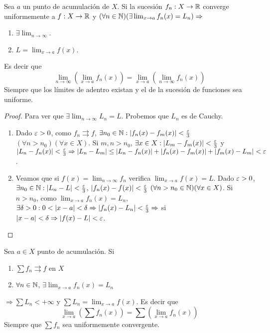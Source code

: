 \begin{theorem}
  Sea $a$ un punto de acumulación de $X$. Si la sucesión $f_n: X \to \mathbb{R}$ converge uniformemente a $f: X \to \mathbb{R}$ y $(\forall n \in \mathbb{N})(\exists \lim_{x \to a} f_n(x) = L_n) \Rightarrow$
  \begin{enumerate}
    \item $\exists \lim_{n \to \infty}$.
    \item $L = \lim_{x \to a} f(x)$.
  \end{enumerate}
  Es decir que \begin{equation}
    \lim_{n \to \infty}(\lim_{x \to a} f_n(x)) = \lim_{x \to a}(\lim_{n \to \infty} f_n(x))
  \end{equation}
  Siempre que los límites de adentro existan y el de la sucesión de funciones sea uniforme.

  \begin{proof}
    Para ver que $\exists \lim_{n \to \infty} L_n = L$. Probemos que $L_n$ es de Cauchy.
    \begin{enumerate}
      \item Dado $\varepsilon > 0$, como $f_n \rightrightarrows f$, $\exists n_0 \in \mathbb{N} : |f_n(x) - f_m(x)| < \frac{\varepsilon}{3}$ $(\forall n > n_0)(\forall x \in X)$. Si $m,n > n_0$, $\exists x \in X : |L_m - f_m(x)| < \frac{\varepsilon}{3}$ y $|L_n - f_n(x)| < \frac{\varepsilon}{3} \Rightarrow |L_n - L_m| \leq |L_n - f_n(x)| + |f_n(x) - f_m(x)| + |f_m(x) - L_m| < \varepsilon$.
      \item Veamos que si $f(x) = \lim_{n \to \infty} f_n$ verifica $\lim_{x \to a} f(x) = L$. Dado $\varepsilon > 0$, $\exists n_0 \in \mathbb{N} : |L_n - L| < \frac{\varepsilon}{3}$, $|f_n(x) - f(x)| < \frac{\varepsilon}{3}$ $(\forall n > n_0 \in \mathbb{N})(\forall x \in X)$. Si $n > n_0$, como $\lim_{x \to a} f_n(x) = L_n$, $\exists \delta > 0 : 0 < |x-a| < \delta \Rightarrow |f_n(x) - L_n| < \frac{\varepsilon}{3} \Rightarrow$ si $|x-a| < \delta \Rightarrow |f(x) - L| < \varepsilon$. 
    \end{enumerate}
  \end{proof}
\end{theorem}

\begin{corollary}
  Sea $a \in X$ punto de acumulación. Si \begin{enumerate}
    \item $\sum f_n \rightrightarrows f$ en $X$
    \item $\forall n \in \mathbb{N}$, $\exists \lim_{x \to a} f_n(x) = L_n$
  \end{enumerate} $\Rightarrow \sum L_n < +\infty$ y $\sum L_n = \lim_{x \to a} f(x)$.
  Es decir que \begin{equation}
    \lim_{x \to a}(\sum f_n(x)) = \sum(\lim_{x \to a} f_n(x))
  \end{equation} Siempre que $\sum f_n$ sea uniformemente convergente.
\end{corollary}

